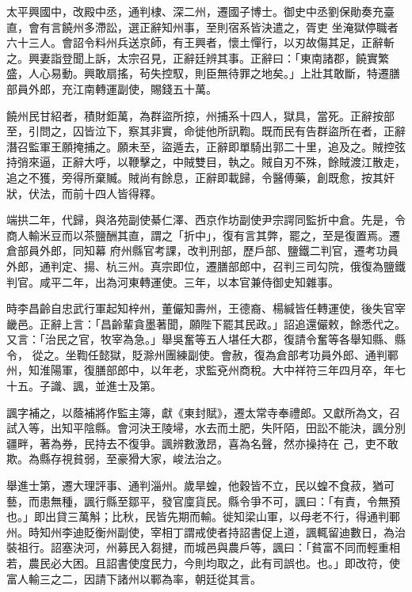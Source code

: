 \begin{pinyinscope}
 太平興國中，改殿中丞，通判棣、深二州，遷國子博士。御史中丞劉保勛奏充臺直，會有言饒州多滯訟，選正辭知州事，至則宿系皆決遣之，胥吏
 坐淹獄停職者六十三人。會詔令料州兵送京師，有王興者，懷土憚行，以刃故傷其足，正辭斬之。興妻詣登聞上訴，太宗召見，正辭廷辨其事。正辭曰：「東南諸郡，饒實繁盛，人心易動。興敢扇搖，茍失控馭，則臣無待罪之地矣。」上壯其敢斷，特遷膳部員外郎，充江南轉運副使，賜錢五十萬。



 饒州民甘紹者，積財鉅萬，為群盜所掠，州捕系十四人，獄具，當死。正辭按部至，引問之，囚皆泣下，察其非實，命徙他所訊鞫。既而民有告群盜所在者，正辭
 潛召監軍王願掩捕之。願未至，盜遁去，正辭即單騎出郭二十里，追及之。賊控弦持弰來逼，正辭大呼，以鞭擊之，中賊雙目，執之。賊自刃不殊，餘賊渡江散走，追之不獲，旁得所棄贓。賊尚有餘息，正辭即載歸，令醫傅藥，創既愈，按其奸狀，伏法，而前十四人皆得釋。



 端拱二年，代歸，與洛苑副使綦仁澤、西京作坊副使尹宗諤同監折中倉。先是，令商人輸米豆而以茶鹽酬其直，謂之「折中」，復有言其弊，罷之，至是復置焉。遷倉部員外郎，同知幕
 府州縣官考課，改判刑部，歷戶部、鹽鐵二判官，遷考功員外郎，通判定、揚、杭三州。真宗即位，遷膳部郎中，召判三司勾院，俄復為鹽鐵判官。咸平二年，出為河東轉運使。三年，以本官兼侍御史知雜事。



 時李昌齡自忠武行軍起知梓州，董儼知壽州，王德裔、楊緘皆任轉運使，後失官宰畿邑。正辭上言：「昌齡輩貪墨著聞，願陛下罷其民政。」詔追還儼敕，餘悉代之。又言：「治民之官，牧宰為急。」舉吳奮等五人堪任大郡，復請令奮等各舉知縣、縣令，
 從之。坐鞫任懿獄，貶滁州團練副使。會赦，復為倉部考功員外郎、通判鄆州，知淮陽軍，復膳部郎中，以年老，求監兗州商稅。大中祥符三年四月卒，年七十五。子識、諷，並進士及第。



 諷字補之，以蔭補將作監主簿，獻《東封賦》，遷太常寺奉禮郎。又獻所為文，召試入等，出知平陰縣。會河決王陵埽，水去而土肥，失阡陌，田訟不能決，諷分別疆畔，著為券，民持去不復爭。諷辨數激昂，喜為名聲，然亦操持在
 己，吏不敢欺。為縣存視貧弱，至豪猾大家，峻法治之。



 舉進士第，遷大理評事、通判淄州。歲旱蝗，他穀皆不立，民以蝗不食菽，猶可藝，而患無種，諷行縣至鄒平，發官廩貨民。縣令爭不可，諷曰：「有責，令無預也。」即出貸三萬斛；比秋，民皆先期而輸。徙知梁山軍，以母老不行，得通判鄆州。時知州李迪貶衡州副使，宰相丁謂戒使者持詔書促上道，諷輒留迪數日，為治裝祖行。詔塞決河，州募民入芻揵，而城邑與農戶等，諷曰：「貧富不同而輕重相
 若，農民必大困。且詔書使度民力，今則均取之，此有司誤也。也。」即改符，使富人輸三之二，因請下諸州以鄆為率，朝廷從其言。




\end{pinyinscope}
